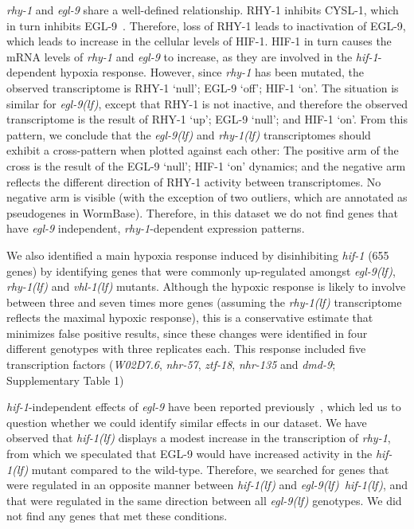 \documentclass[10pt, onecolumn]{article}
\newcommand{\gene}[1]{\emph{#1}}
\newcommand{\nhr}{\emph{\mbox{nhr-57}}}
\newcommand{\egl}{\emph{\mbox{egl-9}(lf)}}
\newcommand{\rhy}{\emph{\mbox{rhy-1}(lf)}}
\newcommand{\vhl}{\emph{\mbox{vhl-1}(lf)}}
\newcommand{\eglhif}{\emph{\mbox{egl-9(lf)}~\mbox{hif-1(lf)}}}
\newcommand{\hif}{\emph{\mbox{hif-1(lf)}}}
\newcommand{\eglp}{EGL-9}
\newcommand{\rhyp}{RHY-1}
\newcommand{\hifp}{HIF-1}
\newcommand{\cyslp}{CYSL-1}
\begin{document}
\gene{rhy-1} and \gene{egl-9} share a well-defined relationship. \rhyp{}
inhibits \cyslp{}, which in turn inhibits \eglp{}~\cite{Ma2012}. Therefore, loss
of \rhyp{} leads to inactivation of \eglp{}, which leads to increase in the
cellular levels of \hifp{}. \hifp{} in turn causes the mRNA levels of
\gene{rhy-1} and \gene{egl-9} to increase, as they are involved in the
\gene{hif-1}-dependent hypoxia response. However, since \gene{rhy-1} has been
mutated, the observed transcriptome is \rhyp{} `null'; \eglp{} `off'; \hifp{}
`on'. The situation is similar for \egl{}, except that \rhyp{} is not inactive,
and therefore the observed transcriptome is the result of \rhyp{} `up'; \eglp{}
`null'; and \hifp{} `on'. From this pattern, we conclude that the \egl{} and
\rhy{} transcriptomes should exhibit a cross-pattern when plotted against each
other: The positive arm of the cross is the result of the \eglp{} `null';
\hifp{} `on' dynamics; and the negative arm reflects the different direction of
\rhyp{} activity between transcriptomes. No negative arm is visible (with the
exception of two outliers, which are annotated as pseudogenes in WormBase).
Therefore, in this dataset we do not find genes that have \gene{egl-9}
independent, \gene{rhy-1}-dependent expression patterns.

We also identified a main hypoxia response induced by disinhibiting
\gene{hif-1} (655 genes) by identifying genes that were commonly up-regulated
amongst \egl{}, \rhy{} and \vhl{} mutants. Although the hypoxic response is
likely to involve between three and seven times more genes (assuming the \rhy{}
transcriptome reflects the maximal hypoxic response), this is a conservative
estimate that minimizes false positive results, since these changes were
identified in four different genotypes with three replicates each. This response
included five transcription factors (\gene{W02D7.6}, \nhr{}, \gene{ztf-18},
\gene{nhr-135} and \gene{dmd-9}; Supplementary Table 1)

\gene{hif-1}-independent effects of \gene{egl-9} have been reported
previously~\cite{Park2012}, which led us to question whether we could identify
similar effects in our dataset. We have observed that \hif{} displays a modest
increase in the transcription of \gene{rhy-1}, from which we speculated that
\eglp{} would have increased activity in the \hif{} mutant compared to the
wild-type. Therefore, we searched for genes that were regulated in an opposite
manner between \hif{} and \eglhif{}, and that were regulated in the same
direction between all \egl{} genotypes. We did not find any genes that met these
conditions.
\end{document}
